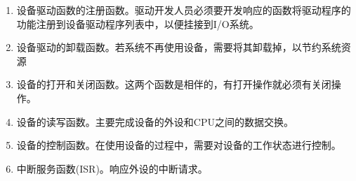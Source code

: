 \begin{enumerate}
\item 设备驱动函数的注册函数。驱动开发人员必须要开发响应的函数将驱动程序的功能注册到设备驱动程序列表中，以便挂接到I/O系统。

\item 设备驱动的卸载函数。若系统不再使用设备，需要将其卸载掉，以节约系统资源

\item 设备的打开和关闭函数。这两个函数是相伴的，有打开操作就必须有关闭操作。

\item 设备的读写函数。主要完成设备的外设和CPU之间的数据交换。

\item 设备的控制函数。在使用设备的过程中，需要对设备的工作状态进行控制。

\item 中断服务函数(ISR)。响应外设的中断请求。
\end{enumerate}\\



